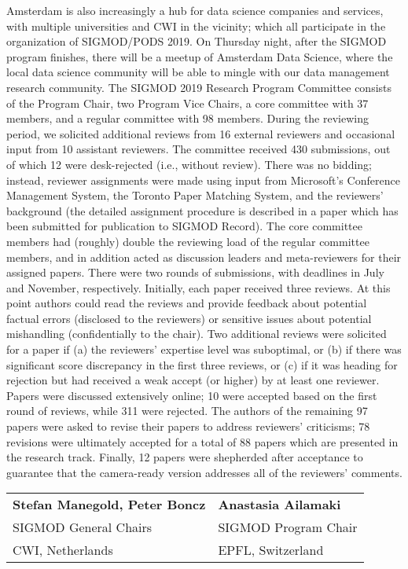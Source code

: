 Amsterdam is also increasingly a hub for data science companies and services, with multiple universities and CWI in the vicinity; which all participate in the organization of SIGMOD/PODS 2019. On Thursday night, after the SIGMOD program finishes, there will be a meetup of Amsterdam Data Science, where the local data science community will be able to mingle with our data management research community.
The SIGMOD 2019 Research Program Committee consists of the Program Chair, two Program Vice Chairs, a core committee with 37 members, and a regular committee with 98 members. During the reviewing period, we solicited additional reviews from 16 external reviewers and occasional input from 10 assistant reviewers. The committee received 430 submissions, out of which 12 were desk-rejected (i.e., without review). There was no bidding; instead, reviewer assignments were made using input from Microsoft's Conference Management System, the Toronto Paper Matching System, and the reviewers' background (the detailed assignment procedure is described in a paper which has been submitted for publication to SIGMOD Record). The core committee members had (roughly) double the reviewing load of the regular committee members, and in addition acted as discussion leaders and meta-reviewers for their assigned papers. There were two rounds of submissions, with deadlines in July and November, respectively. Initially, each paper received three reviews. At this point authors could read the reviews and provide feedback about potential factual errors (disclosed to the reviewers) or sensitive issues about potential mishandling (confidentially to the chair). Two additional reviews were solicited for a paper if (a) the reviewers' expertise level was suboptimal, or (b) if there was significant score discrepancy in the first three reviews, or (c) if it was heading for rejection but had received a weak accept (or higher) by at least one reviewer. Papers were discussed extensively online; 10 were accepted based on the first round of reviews, while 311 were rejected. The authors of the remaining 97 papers were asked to revise their papers to address reviewers' criticisms; 78 revisions were ultimately accepted for a total of 88 papers which are presented in the research track. Finally, 12 papers were shepherded after acceptance to guarantee that the camera-ready version addresses all of the reviewers' comments.

\vspace{2mm}
\begin{tabular}{p{}p{}}
\small
\textbf{Stefan Manegold, Peter Boncz} & \small\textbf{Anastasia Ailamaki} \\
\small SIGMOD  General Chairs &  \small SIGMOD Program Chair \\
\small CWI, Netherlands & \small EPFL, Switzerland
\end{tabular}
  
